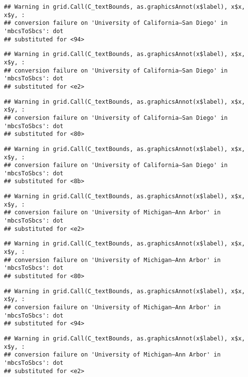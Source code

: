 \documentclass[]{article}
\begin{document}
\begin{verbatim}
## Warning in grid.Call(C_textBounds, as.graphicsAnnot(x$label), x$x, x$y, :
## conversion failure on 'University of California—​San Diego' in 'mbcsToSbcs': dot
## substituted for <94>
\end{verbatim}

\begin{verbatim}
## Warning in grid.Call(C_textBounds, as.graphicsAnnot(x$label), x$x, x$y, :
## conversion failure on 'University of California—​San Diego' in 'mbcsToSbcs': dot
## substituted for <e2>
\end{verbatim}

\begin{verbatim}
## Warning in grid.Call(C_textBounds, as.graphicsAnnot(x$label), x$x, x$y, :
## conversion failure on 'University of California—​San Diego' in 'mbcsToSbcs': dot
## substituted for <80>
\end{verbatim}

\begin{verbatim}
## Warning in grid.Call(C_textBounds, as.graphicsAnnot(x$label), x$x, x$y, :
## conversion failure on 'University of California—​San Diego' in 'mbcsToSbcs': dot
## substituted for <8b>
\end{verbatim}

\begin{verbatim}
## Warning in grid.Call(C_textBounds, as.graphicsAnnot(x$label), x$x, x$y, :
## conversion failure on 'University of Michigan—​Ann Arbor' in 'mbcsToSbcs': dot
## substituted for <e2>
\end{verbatim}

\begin{verbatim}
## Warning in grid.Call(C_textBounds, as.graphicsAnnot(x$label), x$x, x$y, :
## conversion failure on 'University of Michigan—​Ann Arbor' in 'mbcsToSbcs': dot
## substituted for <80>
\end{verbatim}

\begin{verbatim}
## Warning in grid.Call(C_textBounds, as.graphicsAnnot(x$label), x$x, x$y, :
## conversion failure on 'University of Michigan—​Ann Arbor' in 'mbcsToSbcs': dot
## substituted for <94>
\end{verbatim}

\begin{verbatim}
## Warning in grid.Call(C_textBounds, as.graphicsAnnot(x$label), x$x, x$y, :
## conversion failure on 'University of Michigan—​Ann Arbor' in 'mbcsToSbcs': dot
## substituted for <e2>
\end{verbatim}
\end{document}
